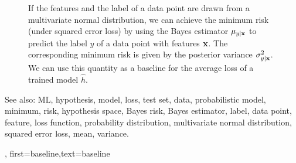 {{\begin{figure}[H]
\begin{center}
		\end{center}
		\caption{If the features and the label of a data point are drawn from a multivariate normal distribution, we 
		can achieve the minimum risk (under squared error loss) by using the Bayes estimator $\mu_{y|{\bf x}}$ 
		to predict the label $y$ of a data point with features ${\bf x}$. The corresponding 
		minimum risk is given by the posterior variance $\sigma^{2}_{y|{\bf x}}$. We can use 
		this quantity as a baseline for the average loss of a trained model $\hat{h}$. \label{fig_post_baseline_dict}}
	\end{figure}
		See also: ML, hypothesis, model, loss, test set, data, probabilistic model, minimum, risk, hypothesis space, Bayes risk, Bayes estimator, label, data point, feature, loss function, probability distribution, multivariate normal distribution, squared error loss, mean, variance.},
    first={baseline},text={baseline}
}

